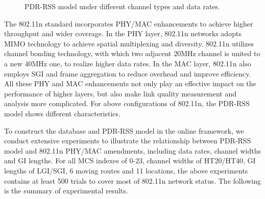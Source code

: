 \documentclass[draftclsnofoot,journal,onecolumn,11pt]{IEEEtran}
\begin{document}
\begin{figure}[!t]
\centerline{
}
\caption{PDR-RSS model under different channel types and data rates.}
\label{pdr}
\end{figure}

The 802.11n standard incorporates PHY/MAC enhancements to achieve higher throughput and wider coverage. In the PHY layer, 802.11n networks adopts MIMO technology to achieve spatial multiplexing and diversity. 802.11n utilizes channel bonding technology, with which two adjacent 20MHz channel is united to a new 40MHz one, to realize higher data rates. In the MAC layer, 802.11n also employs SGI and frame aggregation to reduce overhead and improve efficiency. All these PHY and MAC enhancements not only play an effective impact on the performance of higher layers, but also make link quality measurement and analysis more complicated. For above configurations of 802.11n, the PDR-RSS model shows different characteristics.

To construct the database and PDR-RSS model in the online framework, we conduct extensive experiments to illustrate the relationship between PDR-RSS model and 802.11n PHY/MAC amendments, including data rates, channel widths and GI lengths. For all MCS indexes of 0-23, channel widths of HT20/HT40, GI lengths of LGI/SGI, 6 moving routes and 11 locations, the above experiments contains at least 500 trials to cover most of 802.11n network status. The following is the summary of experimental results.
\end{document}
